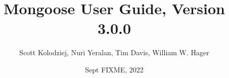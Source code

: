 \title{Mongoose User Guide, Version 3.0.0}
\author{Scott Kolodziej, Nuri Yeralan, Tim Davis, William W. Hager}
\date{Sept FIXME, 2022}
